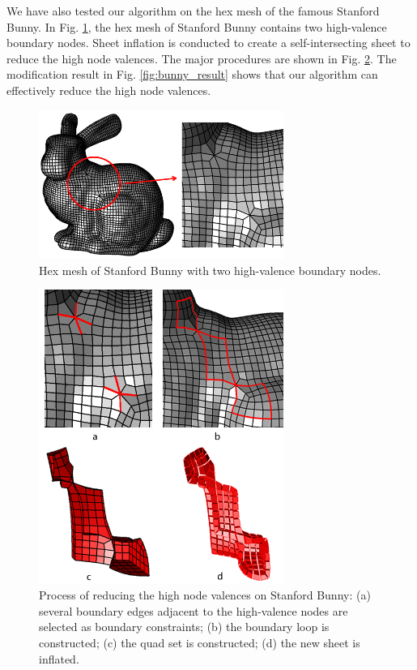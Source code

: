 \documentclass[final,5p,times,twocolumn]{elsarticle}
\begin{document}
We have also tested our algorithm on the hex mesh of the famous Stanford Bunny. In Fig. \ref{fig:bunny_input}, the hex mesh of Stanford Bunny contains two high-valence boundary nodes. Sheet inflation is conducted to create a self-intersecting sheet to reduce the high node valences. The major procedures are shown in Fig. \ref{fig:bunny_proc}. The modification result in Fig. \ref{fig:bunny_result} shows that our algorithm can effectively reduce the high node valences.

\begin{figure}[htbp]
\begin{center}
\includegraphics[width=8cm]{rev_figures/bunny_input.png}
\caption{Hex mesh of Stanford Bunny with two high-valence boundary nodes.}
\label{fig:bunny_input}
\end{center}
\end{figure}


\begin{figure}[htbp]
\begin{center}
\includegraphics[width=8cm]{rev_figures/bunny_proc.png}
\caption{Process of reducing the high node valences on Stanford Bunny: (a) several boundary edges adjacent to the high-valence nodes are selected as boundary constraints; (b) the boundary loop is constructed; (c) the quad set is constructed; (d) the new sheet is inflated.}
\label{fig:bunny_proc}
\end{center}
\end{figure}
\end{document}
